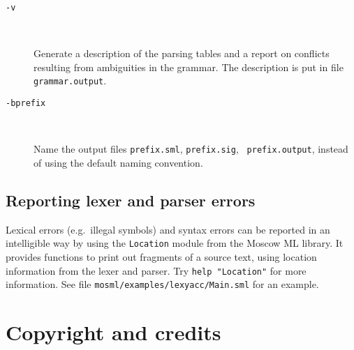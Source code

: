 \documentclass[fleqn,a4paper]{article}
\begin{document}
\begin{description}
\item[{\tt -v}]\mbox{ }

  Generate a description of the parsing tables and a report on
  conflicts resulting from ambiguities in the grammar.  The
  description is put in file {\tt grammar.output}.

\item[{\tt -b{\rm prefix}}]\mbox{ }

  Name the output files {\tt prefix.sml}, {\tt prefix.sig}, {\tt
    prefix.output}, instead of using the default naming convention.
\end{description}


\subsection{Reporting lexer and parser errors}

Lexical errors (e.g.\ illegal symbols) and syntax errors can be
reported in an intelligible way by using the {\tt Location} module
from the Moscow ML library.  It provides functions to print out
fragments of a source text, using location information from the lexer
and parser.  Try {\tt help "Location"} for more information.  See file
{\tt mosml/examples/lexyacc/Main.sml} for an example.

\newpage

\section{Copyright and credits}
\label{sec-copyright}
\end{document}
